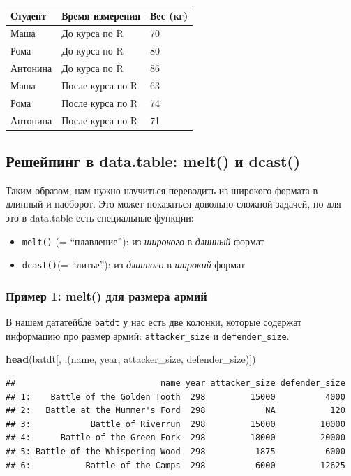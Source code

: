 \documentclass[]{book}
\newenvironment{Shaded}{\begin{snugshade}}{\end{snugshade}}
\newcommand{\KeywordTok}[1]{\textcolor[rgb]{0.13,0.29,0.53}{\textbf{#1}}}
\newcommand{\NormalTok}[1]{#1}
\begin{document}
\begin{longtable}[]{@{}lll@{}}
\toprule
Студент & Время измерения & Вес (кг)\tabularnewline
\midrule
\endhead
Маша & До курса по R & 70\tabularnewline
Рома & До курса по R & 80\tabularnewline
Антонина & До курса по R & 86\tabularnewline
Маша & После курса по R & 63\tabularnewline
Рома & После курса по R & 74\tabularnewline
Антонина & После курса по R & 71\tabularnewline
\bottomrule
\end{longtable}

\subsection{Решейпинг в data.table: melt() и dcast()}\label{melt_dcast}

Таким образом, нам нужно научиться переводить из широкого формата в
длинный и наоборот. Это может показаться довольно сложной задачей, но
для это в data.table есть специальные функции:

\begin{itemize}
\item
  \texttt{melt()} (= ``плавление''): из \emph{широкого} в \emph{длинный}
  формат
\item
  \texttt{dcast()}(= ``литье''): из \emph{длинного} в \emph{широкий}
  формат
\end{itemize}

\subsubsection{Пример 1: melt() для размера армий}\label{melt}

В нашем дататейбле \texttt{batdt} у нас есть две колонки, которые
содержат информацию про размер армий: \texttt{attacker\_size} и
\texttt{defender\_size}.

\begin{Shaded}
\begin{Highlighting}[]
\KeywordTok{head}\NormalTok{(batdt[, .(name, year, attacker_size, defender_size)])}
\end{Highlighting}
\end{Shaded}

\begin{verbatim}
##                             name year attacker_size defender_size
## 1:    Battle of the Golden Tooth  298         15000          4000
## 2:   Battle at the Mummer's Ford  298            NA           120
## 3:            Battle of Riverrun  298         15000         10000
## 4:      Battle of the Green Fork  298         18000         20000
## 5: Battle of the Whispering Wood  298          1875          6000
## 6:           Battle of the Camps  298          6000         12625
\end{verbatim}
\end{document}
